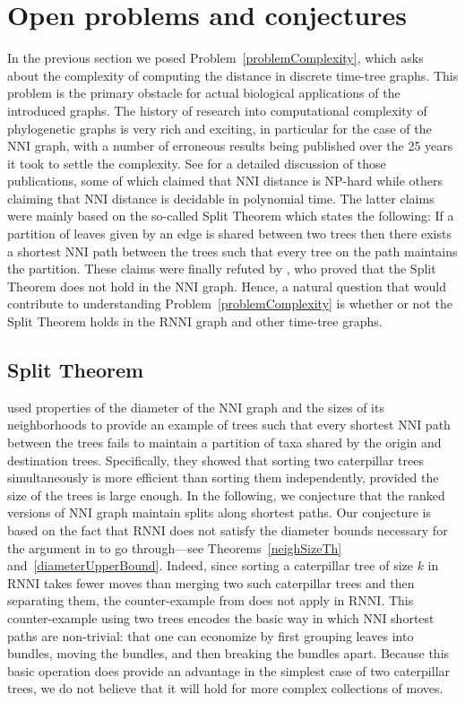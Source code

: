 \documentclass[11pt]{amsart}
\theoremstyle{definition}
\newcommand{\nni}{\mathrm{NNI}}
\newcommand{\rnni}{\mathrm{RNNI}}
\begin{document}
\section{Open problems and conjectures}

In the previous section we posed Problem~\ref{problemComplexity}, which asks about the complexity of computing the distance in discrete time-tree graphs.
This problem is the primary obstacle for actual biological applications of the introduced graphs.
The history of research into computational complexity of phylogenetic graphs is very rich and exciting, in particular for the case of the $\nni$ graph, with a number of erroneous results being published over the 25 years it took to settle the complexity.
See \autocite{Dasgupta2000-xa} for a detailed discussion of those publications, some of which claimed that $\nni$ distance is NP-hard while others claiming that $\nni$ distance is decidable in polynomial time.
The latter claims were mainly based on the so-called Split Theorem which states the following:
If a partition of leaves given by an edge is shared between two trees then there exists a shortest $\nni$ path between the trees such that every tree on the path maintains the partition.
These claims were finally refuted by \textcite{li1996some}, who proved that the Split Theorem does not hold in the $\nni$ graph.
Hence, a natural question that would contribute to understanding Problem~\ref{problemComplexity} is whether or not the Split Theorem holds in the $\rnni$ graph and other time-tree graphs.


\subsection{Split Theorem}

\textcite{li1996some} used properties of the diameter of the $\nni$ graph and the sizes of its neighborhoods to provide an example of trees such that every shortest $\nni$ path between the trees fails to maintain a partition of taxa shared by the origin and destination trees.
Specifically, they showed that sorting two caterpillar trees simultaneously is more efficient than sorting them independently, provided the size of the trees is large enough.
In the following, we conjecture that the ranked versions of $\nni$ graph maintain splits along shortest paths.
Our conjecture is based on the fact that $\rnni$ does not satisfy the diameter bounds necessary for the argument in \autocite{li1996some} to go through---see Theorems~\ref{neighSizeTh} and~\ref{diameterUpperBound}.
Indeed, since sorting a caterpillar tree of size $k$ in $\rnni$ takes fewer moves than merging two such caterpillar trees and then separating them, the counter-example from \autocite{li1996some} does not apply in $\rnni$.
This counter-example using two trees encodes the basic way in which $\nni$ shortest paths are non-trivial: that one can economize by first grouping leaves into bundles, moving the bundles, and then breaking the bundles apart.
Because this basic operation does provide an advantage in the simplest case of two caterpillar trees, we do not believe that it will hold for more complex collections of moves.
\end{document}
